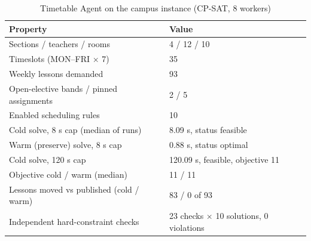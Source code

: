 \begin{table}[t]
\centering
\small
\begin{tabular}{ll}
\toprule
Property & Value \\
\midrule
Sections / teachers / rooms & 4 / 12 / 10 \\
Timeslots (MON--FRI $\times$ 7) & 35 \\
Weekly lessons demanded & 93 \\
Open-elective bands / pinned assignments & 2 / 5 \\
Enabled scheduling rules & 10 \\
Cold solve, 8 s cap (median of runs) & 8.09 s, status feasible \\
Warm (preserve) solve, 8 s cap & 0.88 s, status optimal \\
Cold solve, 120 s cap & 120.09 s, feasible, objective 11 \\
Objective cold / warm (median) & 11 / 11 \\
Lessons moved vs published (cold / warm) & 83 / 0 of 93 \\
Independent hard-constraint checks & 23 checks $\times$ 10 solutions, 0 violations \\
\bottomrule
\end{tabular}
\caption{Timetable Agent on the campus instance (CP-SAT, 8 workers)}
\label{tab:t4-solver-instance}
\end{table}
